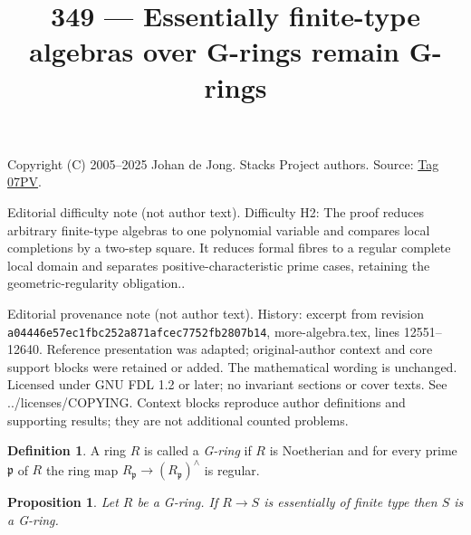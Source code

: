 \documentclass{amsart}
\theoremstyle{plain}
\newtheorem{proposition}[subsection]{Proposition}
\theoremstyle{definition}
\newtheorem{definition}[subsection]{Definition}
\theoremstyle{remark}
\numberwithin{equation}{subsection}
\begin{document}
\title[Stacks Project, Tag 07PV]{349 --- Essentially finite-type algebras over G-rings remain G-rings}
\maketitle
\noindent Copyright (C) 2005--2025 Johan de Jong. Stacks Project authors. Source: \href{https://stacks.math.columbia.edu/tag/07PV}{Tag 07PV}.

\noindent Editorial difficulty note (not author text). Difficulty H2: The proof reduces arbitrary finite-type algebras to one polynomial variable and compares local completions by a two-step square. It reduces formal fibres to a regular complete local domain and separates positive-characteristic prime cases, retaining the geometric-regularity obligation..

\noindent Editorial provenance note (not author text). History: excerpt from revision \texttt{a0444\allowbreak 6e57e\allowbreak c1fbc\allowbreak 252a8\allowbreak 71afc\allowbreak ec775\allowbreak 2fb28\allowbreak 07b14}, more-algebra.tex, lines 12551--12640. Reference presentation was adapted; original-author context and core support blocks were retained or added. The mathematical wording is unchanged. Licensed under GNU FDL 1.2 or later; no invariant sections or cover texts. See ../licenses/COPYING. Context blocks reproduce author definitions and supporting results; they are not additional counted problems.

\begin{definition}
\label{definition-G-ring}
A ring $R$ is called a {\it G-ring} if $R$ is Noetherian and for every
prime $\mathfrak p$ of $R$ the ring map
$R_\mathfrak p \to (R_\mathfrak p)^\wedge$ is regular.
\end{definition}

\begin{proposition}
\label{proposition-finite-type-over-G-ring}
Let $R$ be a G-ring. If $R \to S$ is essentially of finite type
then $S$ is a G-ring.
\end{proposition}
\end{document}
